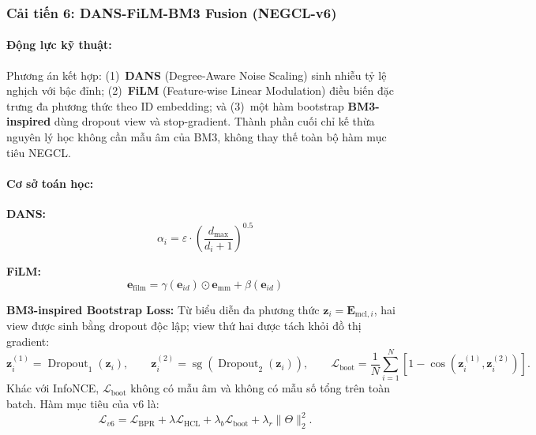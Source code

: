 \subsubsection{Cải tiến 6: DANS-FiLM-BM3 Fusion (NEGCL-v6)}

\paragraph{Động lực kỹ thuật:}
Phương án kết hợp: (1)~\textbf{DANS} (Degree-Aware Noise Scaling) sinh nhiễu tỷ lệ nghịch với bậc đỉnh; (2)~\textbf{FiLM} (Feature-wise Linear Modulation) điều biến đặc trưng đa phương thức theo ID embedding; và (3)~một hàm bootstrap \textbf{BM3-inspired} dùng dropout view và stop-gradient. Thành phần cuối chỉ kế thừa nguyên lý học không cần mẫu âm của BM3, không thay thế toàn bộ hàm mục tiêu NEGCL.

\paragraph{Cơ sở toán học:}

\textbf{DANS:}
\begin{equation}
\alpha_i = \varepsilon \cdot \left(\frac{d_{\max}}{d_i + 1}\right)^{0.5}
\end{equation}

\textbf{FiLM:}
\begin{equation}
\mathbf{e}_{\text{film}} = \gamma(\mathbf{e}_{id}) \odot \mathbf{e}_{\text{mm}} + \beta(\mathbf{e}_{id})
\end{equation}

\textbf{BM3-inspired Bootstrap Loss:}
Từ biểu diễn đa phương thức $\mathbf z_i=\mathbf E_{\text{mcl},i}$, hai view được sinh bằng dropout độc lập; view thứ hai được tách khỏi đồ thị gradient:
\begin{equation}
\mathbf z_i^{(1)}=\operatorname{Dropout}_1(\mathbf z_i),
\qquad
\mathbf z_i^{(2)}=\operatorname{sg}\!\left(\operatorname{Dropout}_2(\mathbf z_i)\right),
\qquad
\mathcal L_{\text{boot}}=\frac{1}{N}\sum_{i=1}^{N}\left[1-\cos\!\left(\mathbf z_i^{(1)},\mathbf z_i^{(2)}\right)\right].
\end{equation}
Khác với InfoNCE, $\mathcal L_{\text{boot}}$ không có mẫu âm và không có mẫu số tổng trên toàn batch. Hàm mục tiêu của v6 là:
\begin{equation}
\mathcal L_{v6}=\mathcal L_{\text{BPR}}+\lambda\mathcal L_{\text{HCL}}+\lambda_b\mathcal L_{\text{boot}}+\lambda_r\lVert\Theta\rVert_2^2.
\end{equation}

